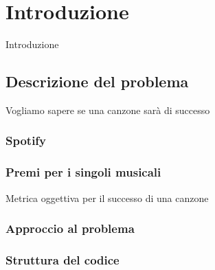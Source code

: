 \chapter{Introduzione}

Introduzione

\section{Descrizione del problema}
Vogliamo sapere se una canzone sarà di successo

\subsection{Spotify}

\subsection{Premi per i singoli musicali}
Metrica oggettiva per il successo di una canzone


\subsection{Approccio al problema}

\subsection{Struttura del codice}